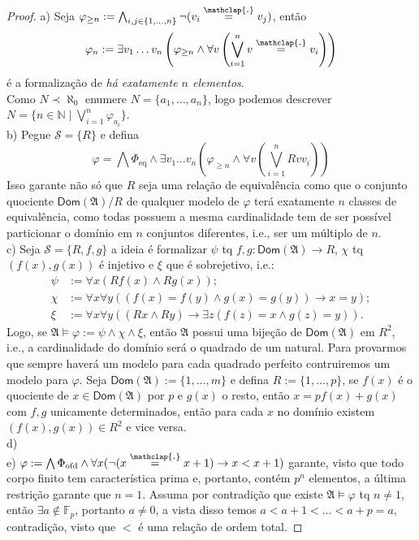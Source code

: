 \documentclass[11pt]{article}
\newcommand{\mc}[1]{\mathcal{#1}}
\newcommand{\mf}[1]{\mathfrak{#1}}
\newcommand{\msf}[1]{\mathsf{#1}}
\newcommand{\mbb}[1]{\mathbb{#1}}
\newcommand\overtext[2]{\stackrel{\mathclap{\normalfont\mbox{#1}}}{#2}}
\begin{document}
\begin{proof}
    a) Seja $\varphi_{\ge n}:=\bigwedge_{i,j\in\{1,\dots,n\}}\neg(v_i\overtext{.}{=}v_j)$, então $$\varphi_n:=\exists v_1\dots v_n\left(\varphi_{\ge n}\wedge\forall v\left(\bigvee_{i=1}^n v\overtext{.}{=} v_i\right)\right)$$ é a formalização de \textit{há exatamente $n$ elementos}.\\
    Como $N\prec\aleph_0$ enumere $N=\{a_1,\dots,a_n\}$, logo podemos descrever $N=\bigl\{n\in\mbb{N}\mid\bigvee_{i=1}^n\varphi_{a_i}\bigr\}$.\\
    b) Pegue $\mc{S}=\{R\}$ e defina $$\varphi=\bigwedge\Phi_\text{eq}\wedge\exists v_1\dots v_n\left(\varphi_{\ge n}\wedge\forall v\left(\bigvee_{i=1}^nRvv_i\right)\right)$$
    Isso garante não só que $R$ seja uma relação de equivalência como que o conjunto quociente $\msf{Dom}(\mf{A})/R$ de qualquer modelo de $\varphi$ terá exatamente $n$ classes de equivalência, como todas possuem a mesma cardinalidade tem de ser possível particionar o domínio em $n$ conjuntos diferentes, i.e., ser um múltiplo de $n$.\\
    c) Seja $\mc{S}=\{R,f,g\}$ a ideia é formalizar $\psi$ tq $f,g:\msf{Dom}(\mf{A})\to R$, $\chi$ tq $(f(x),g(x))$ é injetivo e $\xi$ que é sobrejetivo, i.e.:
    \begin{align*}
        \psi & := \forall x(Rf(x)\wedge Rg(x));\\
        \chi & := \forall x\forall y((f(x)=f(y)\wedge g(x)=g(y))\rightarrow x=y);\\
        \xi & := \forall x\forall y((Rx\wedge Ry)\rightarrow\exists z(f(z)=x\wedge g(z)=y)).
    \end{align*}
    Logo, se $\mf{A}\vDash\varphi:=\psi\wedge\chi\wedge\xi$, então $\mf{A}$ possui uma bijeção de $\msf{Dom}(\mf{A})$ em $R^2$, i.e., a cardinalidade do domínio será o quadrado de um natural. Para provarmos que sempre haverá um modelo para cada quadrado perfeito contruiremos um modelo para $\varphi$. Seja $\msf{Dom}(\mf{A}):=\{1,\dots,m\}$ e defina $R:=\{1,\dots,p\}$, se $f(x)$ é o quociente de $x\in\msf{Dom}(\mf{A})$ por $p$ e $g(x)$ o resto, então $x=pf(x)+g(x)$ com $f,g$ unicamente determinados, então para cada $x$ no domínio existem $(f(x),g(x))\in R^2$ e vice versa.\\
    d) \textbf{\color{red}{PENDENTE}}\\
    e) $\varphi:=\bigwedge\Phi_\text{ofd}\wedge\forall x(\neg(x\overtext{.}{=}x+1)\rightarrow x<x+1)$ garante, visto que todo corpo finito tem característica prima e, portanto, contém $p^n$ elementos, a última restrição garante que $n=1$. Assuma por contradição que existe $\mf{A}\vDash\varphi$ tq $n\ne1$, então $\exists a\notin\mbb{F}_p$, portanto $a\ne0$, a vista disso temos $a<a+1<\dots<a+p=a$, contradição, visto que $<$ é uma relação de ordem total.
\end{proof}
\end{document}
